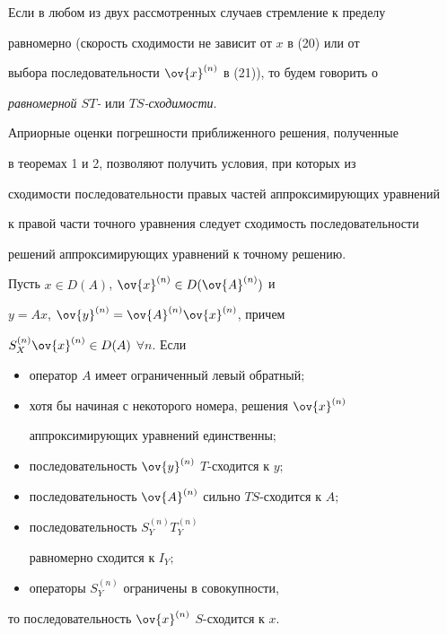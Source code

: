 Если в любом из двух рассмотренных случаев стремление к пределу


равномерно (скорость сходимости не зависит от $x$ в (20) или от


выбора последовательности $\ov{x}^{(n)}$ в (21)), то будем говорить о


{\it равномерной $ST$-} или {\it $TS$-сходимости}.





Априорные оценки погрешности приближенного решения, полученные


в теоремах 1 и 2, позволяют получить условия, при которых из


сходимости последовательности правых частей аппроксимирующих уравнений


к правой части точного уравнения следует сходимость последовательности


решений аппроксимирующих уравнений к точному решению.





\begin{thm}


Пусть $x\in D(A)$, $\ov{x}^{(n)}\in D(\ov{A}^{(n)})$ и


$y=Ax$, $\ov{y}^{(n)}=\ov{A}^{(n)}\ov{x}^{(n)}$, причем


$S^{(n)}_X\ov{x}^{(n)}\in D(A)$ $\forall n$. Если


\begin{itemize}


\item[1)] оператор $A$ имеет ограниченный левый обратный$;$


\item[2)] хотя бы начиная с некоторого номера, решения $\ov{x}^{(n)}$


аппроксимирующих уравнений един\-ст\-вен\-ны$;$


\item[3)] последовательность $\ov{y}^{(n)}$\; $T$-сходится к $y;$


\item[4)] последовательность $\ov{A}^{(n)}$ сильно $TS$-сходится к $A;$


\item[5)] последовательность $S^{(n)}_YT^{(n)}_Y$


равномерно сходится к $I_Y;$


\item[6)] операторы $S^{(n)}_Y$ ограничены в совокупности,


\end{itemize}


то последовательность $\ov{x}^{(n)}$\; $S$-сходится к $x$.


\end{thm}





